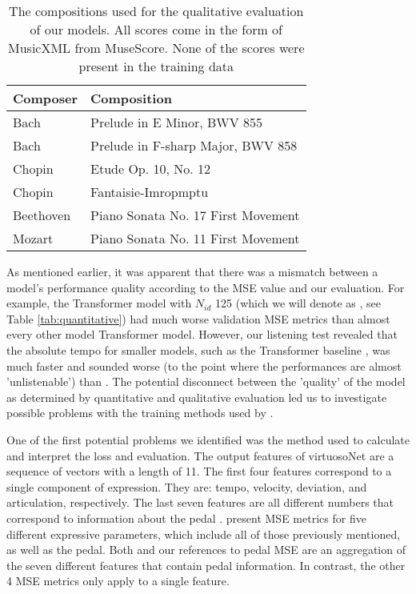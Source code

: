 \begin{table}
    \setlength{\extrarowheight}{3pt}
    \begin{center}
    \begin{tabular}[]{| l | l |}
        \hline
        Composer & Composition \\ 
        \hline 
        Bach & Prelude in E Minor, BWV 855 \\
        Bach & Prelude in F-sharp Major, BWV 858  \\ 
        Chopin & Etude Op. 10, No. 12 \\ 
        Chopin & Fantaisie-Imropmptu \\ 
        Beethoven & Piano Sonata No. 17 First Movement \\ 
        Mozart & Piano Sonata No. 11 First Movement \\ 
        \hline
    \end{tabular}
    \caption{The compositions used for the qualitative evaluation of our models. All scores come in the form of MusicXML from MuseScore. None of the scores were present in the training data}
    \label{tab:compositions}
    \end{center}
\end{table}

As mentioned earlier, it was apparent that there was a mismatch between a model's performance quality according to the MSE value and our evaluation. For example, the Transformer model with $N_{id}$ 125 (which we will denote as , see Table \ref{tab:quantitative}) had much worse validation MSE metrics than almost every other model Transformer model. However, our listening test revealed that the absolute tempo for smaller models, such as the Transformer baseline , was much faster and sounded worse (to the point where the performances are almost 'unlistenable') than . The potential disconnect between the 'quality' of the model as determined by quantitative and qualitative evaluation led us to investigate possible problems with the training methods used by \citet{jeong2019virtuosonet}. 

One of the first potential problems we identified was the method used to calculate and interpret the loss and evaluation. The output features of virtuosoNet are a sequence of vectors with a length of 11. The first four features correspond to a single component of expression. They are: tempo, velocity, deviation, and articulation, respectively. The last seven features are all different numbers that correspond to information about the pedal \cite{jeong2019score}. \citet{jeong2019virtuosonet} present MSE metrics for five different expressive parameters, which include all of those previously mentioned, as well as the pedal. Both \citet{jeong2019virtuosonet} and our references to pedal MSE are an aggregation of the seven different features that contain pedal information. In contrast, the other 4 MSE metrics only apply to a single feature. 

